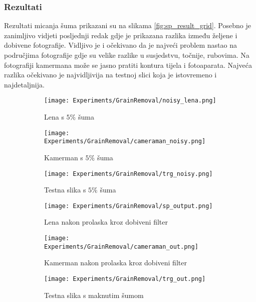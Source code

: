 \subsubsection{Rezultati}
Rezultati micanja šuma prikazani su na slikama \ref{fig:sp_result_grid}.
Posebno je zanimljivo vidjeti posljednji redak gdje je prikazana razlika između željene i dobivene fotografije.
Vidljivo je i očekivano da je najveći problem nastao na područjima fotografije gdje su velike razlike u susjedstvu, točnije, rubovima.
Na fotografiji kamermana može se jasno pratiti kontura tijela i fotoaparata.
Najveća razlika očekivano je najvidljivija na testnoj slici koja je istovremeno i najdetaljnija.

\begin{figure}
	\centering
	\caption{Fotografije iz faze za učenje, validacijske i testne faze prije i nakon micanja šuma CGP-om. Na dnu je također prikazana razlika dobivene slike i one željene.}
	\begin{subfigure}[t]{0.32\textwidth}
		\texttt{[image: Experiments/GrainRemoval/noisy\_lena.png]}
		\caption{Lena s $5\%$ šuma}
	\end{subfigure}
	\begin{subfigure}[t]{0.32\textwidth}
		\texttt{[image: Experiments/GrainRemoval/cameraman\_noisy.png]}
		\caption{Kamerman s $5\%$ šuma}
		\label{fig:sp_samples_camerman}
	\end{subfigure}
	\begin{subfigure}[t]{0.32\textwidth}
		\texttt{[image: Experiments/GrainRemoval/trg\_noisy.png]}
		\caption{Testna slika s $5\%$ šuma}
	\end{subfigure}
	\begin{subfigure}[t]{0.32\textwidth}
		\texttt{[image: Experiments/GrainRemoval/sp\_output.png]}
		\caption{Lena nakon prolaska kroz dobiveni filter}
	\end{subfigure}
	\begin{subfigure}[t]{0.32\textwidth}
		\texttt{[image: Experiments/GrainRemoval/cameraman\_out.png]}
		\caption{Kamerman nakon prolaska kroz dobiveni filter}
	\end{subfigure}
	\begin{subfigure}[t]{0.32\textwidth}
		\texttt{[image: Experiments/GrainRemoval/trg\_out.png]}
		\caption{Testna slika s maknutim šumom}
	\end{subfigure}
	\begin{subfigure}[t]{0.32\textwidth}

\end{subfigure}
\end{figure}
